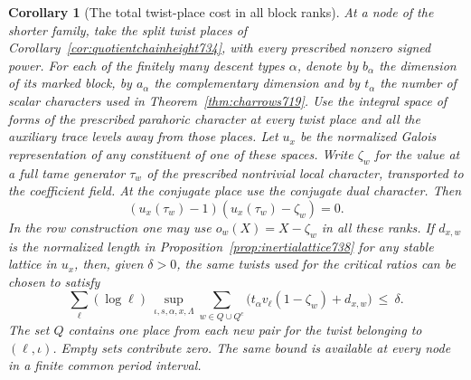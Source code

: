 \documentclass[a4paper,11pt]{article}
\newtheorem{corollary}[proposition]{Corollary}
\theoremstyle{definition}
\theoremstyle{remark}
\numberwithin{equation}{section}
\begin{document}
\begin{corollary}[The total twist-place cost in all block ranks]
\leavevmode\label{cor:alltwistcost738}
At a node of the shorter family, take the split twist places of
Corollary~\ref{cor:quotientchainheight734}, with every prescribed
nonzero signed power. For each of the finitely many descent types
\(\alpha\), denote by \(b_\alpha\) the dimension of its marked
block, by \(a_\alpha\) the complementary dimension and by
\(t_\alpha\) the number of scalar characters used in
Theorem~\ref{thm:charrows719}. Use the integral space of forms of
the prescribed parahoric character at every twist place and all
the auxiliary trace levels away from those places. Let \(u_x\)
be the normalized Galois representation of any constituent of
one of these spaces. Write \(\zeta_w\) for the value at a full
tame generator \(\tau_w\) of the prescribed nontrivial local
character, transported to the coefficient field. At the conjugate
place use the conjugate dual character. Then
\[
          (u_x(\tau_w)-1)(u_x(\tau_w)-\zeta_w)=0 .
\]
In the row construction one may use \(o_w(X)=X-\zeta_w\)
in all these ranks. If \(d_{x,w}\) is the normalized length in
Proposition~\ref{prop:inertialattice738} for any stable lattice
in \(u_x\), then, given \(\delta>0\), the same twists used for
the critical ratios can be chosen to satisfy
\[
 \sum_\ell(\log\ell)\,
 \sup_{\iota,s,\alpha,x,\Lambda}
 \sum_{w\in Q\cup Q^c}
       \bigl(t_\alpha v_\ell(1-\zeta_w)+d_{x,w}\bigr)
       \ \le\ \delta .
\]
The set \(Q\) contains one place from each new pair for the twist
belonging to \((\ell,\iota)\). Empty sets contribute zero. The
same bound is available at every node in a finite common period
interval.
\end{corollary}
\end{document}
